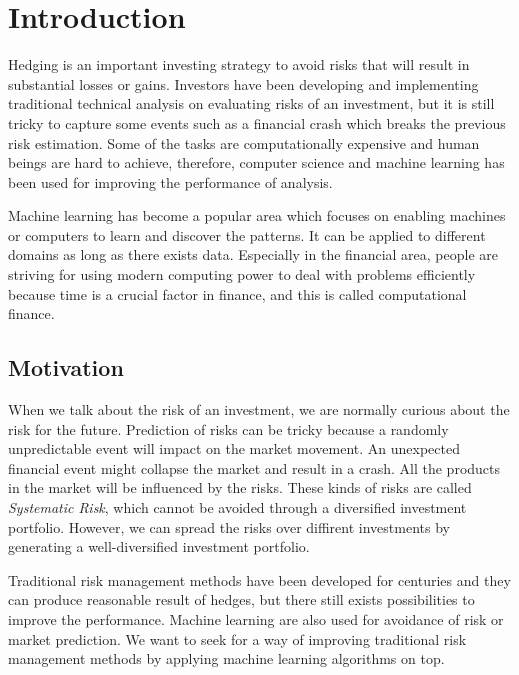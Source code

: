 \documentclass[11pt]{article} %
\theoremstyle{plain}
\theoremstyle{definition}
\begin{document}
\clearpage


\section{Introduction}
\setcounter{page}{1}

Hedging is an important investing strategy to avoid risks that will result in substantial losses or gains. Investors have been developing and implementing traditional technical analysis on evaluating risks of an investment, but it is still tricky to capture some events such as a financial crash which breaks the previous risk estimation. Some of the tasks are computationally expensive and human beings are hard to achieve, therefore, computer science and machine learning has been used for improving the performance of analysis.

Machine learning has become a popular area which focuses on enabling machines or computers to learn and discover the patterns. It can be applied to different domains as long as there exists data. Especially in the financial area, people are striving for using modern computing power to deal with problems efficiently because time is a crucial factor in finance, and this is called computational finance.

\subsection{Motivation}

When we talk about the risk of an investment, we are normally curious about the risk for the future. Prediction of risks can be tricky because a randomly unpredictable event will impact on the market movement. An unexpected financial event might collapse the market and result in a crash. All the products in the market will be influenced by the risks. These kinds of risks are called \textsl{Systematic Risk}, which cannot be avoided through a diversified investment portfolio. However, we can spread the risks over diffirent investments by generating a well-diversified investment portfolio.

Traditional risk management methods have been developed for centuries and they can produce reasonable result of hedges, but there still exists possibilities to improve the performance. Machine learning are also used for avoidance of risk or market prediction. We want to seek for a way of improving traditional risk management methods by applying machine learning algorithms on top.
\end{document}
